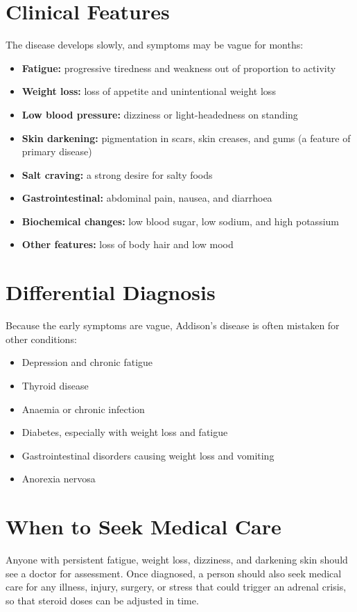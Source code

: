 \section*{Clinical Features}
The disease develops slowly, and symptoms may be vague for months:

\begin{itemize}
    \item \textbf{Fatigue:} progressive tiredness and weakness out of proportion to activity
    \item \textbf{Weight loss:} loss of appetite and unintentional weight loss
    \item \textbf{Low blood pressure:} dizziness or light-headedness on standing
    \item \textbf{Skin darkening:} pigmentation in scars, skin creases, and gums (a feature of primary disease)
    \item \textbf{Salt craving:} a strong desire for salty foods
    \item \textbf{Gastrointestinal:} abdominal pain, nausea, and diarrhoea
    \item \textbf{Biochemical changes:} low blood sugar, low sodium, and high potassium
    \item \textbf{Other features:} loss of body hair and low mood
\end{itemize}

\section*{Differential Diagnosis}
Because the early symptoms are vague, Addison's disease is often mistaken for other conditions:

\begin{itemize}
    \item Depression and chronic fatigue
    \item Thyroid disease
    \item Anaemia or chronic infection
    \item Diabetes, especially with weight loss and fatigue
    \item Gastrointestinal disorders causing weight loss and vomiting
    \item Anorexia nervosa
\end{itemize}

\section*{When to Seek Medical Care}
Anyone with persistent fatigue, weight loss, dizziness, and darkening skin should see a doctor for assessment. Once diagnosed, a person should also seek medical care for any illness, injury, surgery, or stress that could trigger an adrenal crisis, so that steroid doses can be adjusted in time.


